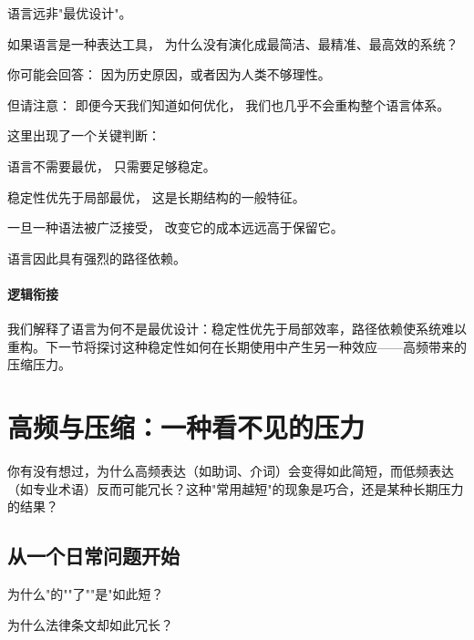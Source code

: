 \documentclass[../main.tex]{subfiles}
\begin{document}
语言远非"最优设计"。

\begin{questionbox}
	如果语言是一种表达工具，
	为什么没有演化成最简洁、最精准、最高效的系统？
\end{questionbox}

\begin{tcolorbox}[colback=yellow!5,title=\textit{读者行为预测}]
	你可能会回答：
	因为历史原因，或者因为人类不够理性。

	但请注意：
	即便今天我们知道如何优化，
	我们也几乎不会重构整个语言体系。
\end{tcolorbox}

这里出现了一个关键判断：

语言不需要最优，
只需要足够稳定。

\begin{readingnote}
	稳定性优先于局部最优，
	这是长期结构的一般特征。
\end{readingnote}

一旦一种语法被广泛接受，
改变它的成本远远高于保留它。

语言因此具有强烈的路径依赖。

\paragraph*{逻辑衔接}
我们解释了语言为何不是最优设计：稳定性优先于局部效率，路径依赖使系统难以重构。下一节将探讨这种稳定性如何在长期使用中产生另一种效应——高频带来的压缩压力。


\section{高频与压缩：一种看不见的压力}

\begin{questionbox}
	你有没有想过，为什么高频表达（如助词、介词）会变得如此简短，而低频表达（如专业术语）反而可能冗长？这种"常用越短"的现象是巧合，还是某种长期压力的结果？
\end{questionbox}

\subsection{从一个日常问题开始}

为什么"的""了""是"如此短？

为什么法律条文却如此冗长？
\end{document}
